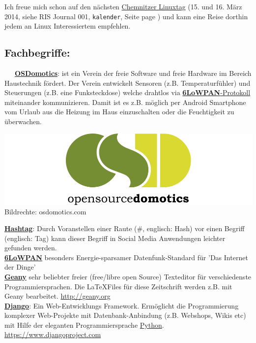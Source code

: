 Ich freue mich schon auf den nächsten \href{http://chemnitzer.linux-tage.de/2014/en/info/}{Chemnitzer Linuxtag} (15. und 16. März 2014, siehe RIS Journal 001, \texttt{kalender}, Seite page \pageref{kalender}) und kann eine Reise dorthin jedem an Linux Interessiertem empfehlen.

\subsection*{Fachbegriffe:}
~~~\href{http://www.osdomotics.com/}{\textbf{OSDomotics}}: ist ein Verein der freie Software und freie Hardware im Bereich Haustechnik fördert. Der Verein entwickelt Sensoren (z.B. Temperaturfühler) und Steuerungen (z.B. eine Funksteckdose) welche drahtlos via \href{http://de.wikipedia.org/wiki/6LoWPAN}{\textbf{6LoWPAN}-Protokoll} miteinander kommunizieren. Damit ist es z.B. möglich per Android Smartphone vom Urlaub aus die Heizung im Haus einzuschalten oder die Feuchtigkeit zu überwachen.
\begin{center}
\includegraphics[width=\linewidth]{chemnitz/chemnitz_osd_domotics_logo-2881.png}
\footnotesize{Bildrechte: osdomotics.com}
\end{center}

\href{http://de.wikipedia.org/wiki/Hashtag}{\textbf{Hashtag}}: Durch Voranstellen einer Raute (\#, englisch: Hash) vor einen Begriff (englisch: Tag) kann dieser Begriff in Social Media Anwendungen leichter gefunden werden. \\

\href{http://de.wikipedia.org/wiki/6LoWPAN}{\textbf{6LoWPAN}} besonders Energie-sparsamer  Datenfunk-Standard für 'Das Internet der Dinge'\\

\href{http://geany.org/}{\textbf{Geany}} sehr beliebter freier (free/libre open Source) Texteditor für verschiedenste Programmiersprachen. Die \LaTeX Files für diese Zeitschrift werden z.B. mit Geany bearbeitet. \url{http://geany.org} \\

\href{https://www.djangoproject.com/}{\textbf{Django}}: Ein Web-Entwicklungs Framework. Ermöglicht die Programmierung komplexer Web-Projekte mit Datenbank-Anbindung (z.B. Webshops, Wikis etc) mit Hilfe der eleganten Programmiersprache \href{http://python.org}{Python}. \url{https://www.djangoproject.com} \\

